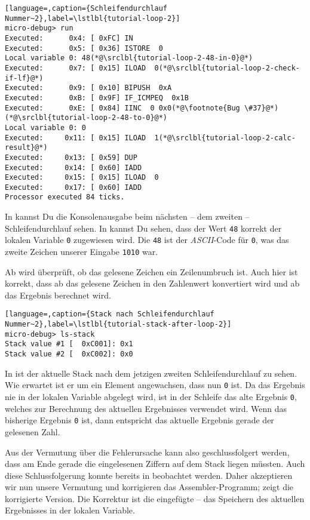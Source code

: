 \begin{lstlisting}[language=,caption={Schleifendurchlauf Nummer~2},label=\lstlbl{tutorial-loop-2}]
micro-debug> run
Executed:      0x4: [ 0xFC] IN 
Executed:      0x5: [ 0x36] ISTORE  0
Local variable 0: 48(*@\srclbl{tutorial-loop-2-48-in-0}@*)
Executed:      0x7: [ 0x15] ILOAD  0(*@\srclbl{tutorial-loop-2-check-if-lf}@*)
Executed:      0x9: [ 0x10] BIPUSH  0xA
Executed:      0xB: [ 0x9F] IF_ICMPEQ  0x1B
Executed:      0xE: [ 0x84] IINC  0 0x0(*@\footnote{Bug \#37}@*)(*@\srclbl{tutorial-loop-2-48-to-0}@*)
Local variable 0: 0
Executed:     0x11: [ 0x15] ILOAD  1(*@\srclbl{tutorial-loop-2-calc-result}@*)
Executed:     0x13: [ 0x59] DUP 
Executed:     0x14: [ 0x60] IADD 
Executed:     0x15: [ 0x15] ILOAD  0
Executed:     0x17: [ 0x60] IADD 
Processor executed 84 ticks.
\end{lstlisting}

In  kannst Du die Konsolenausgabe beim nächsten -- dem zweiten -- Schleifendurchlauf sehen. In  kannst Du sehen, dass der Wert \texttt{48} korrekt der lokalen Variable \texttt{0} zugewiesen wird. Die \texttt{48} ist der \emph{ASCII}-Code für \texttt{0}, was das zweite Zeichen unserer Eingabe \texttt{1010} war.

Ab  wird überprüft, ob das gelesene Zeichen ein Zeilenumbruch ist. Auch hier ist korrekt, dass ab  das gelesene Zeichen in den Zahlenwert konvertiert wird und ab  das Ergebnis berechnet wird.

\begin{lstlisting}[language=,caption={Stack nach Schleifendurchlauf Nummer~2},label=\lstlbl{tutorial-stack-after-loop-2}]
micro-debug> ls-stack
Stack value #1 [  0xC001]: 0x1
Stack value #2 [  0xC002]: 0x0
\end{lstlisting}

In  ist der aktuelle Stack nach dem jetzigen zweiten Schleifendurchlauf zu sehen. Wie erwartet ist er um ein Element angewachsen, dass nun \texttt{0} ist. Da das Ergebnis nie in der lokalen Variable abgelegt wird, ist in der Schleife das alte Ergebnis \texttt{0}, welches zur Berechnung des aktuellen Ergebnisses verwendet wird. Wenn das bisherige Ergebnis \texttt{0} ist, dann entspricht das aktuelle Ergebnis gerade der gelesenen Zahl.

Aus der Vermutung über die Fehlerursache kann also geschlussfolgert werden, dass am Ende gerade die eingelesenen Ziffern auf dem Stack liegen müssten. Auch diese Schlussfolgerung konnte bereits in  beobachtet werden. Daher akzeptieren wir nun unsere Vermutung und korrigieren das Assembler-Programm;  zeigt die korrigierte Version. Die Korrektur ist die eingefügte  -- das Speichern des aktuellen Ergebnisses in der lokalen Variable.


